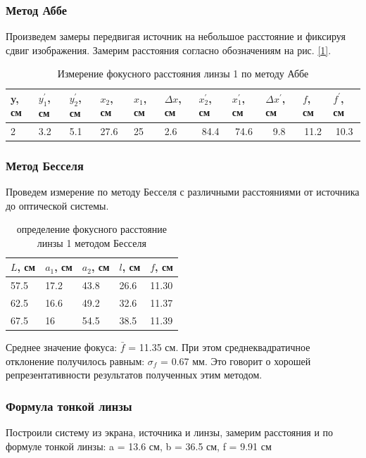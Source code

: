 \documentclass[a4paper, 12pt]{article}%
\newcommand{\picref}[1]{рис. \ref{#1}}
\begin{document}
	\subsubsection{Метод Аббе}
	Произведем замеры передвигая источник на небольшое расстояние и фиксируя сдвиг изображения. Замерим расстояния согласно обозначениям на \picref{1}.
	\begin{table}[H]
		\centering
		\begin{tabular}{|l|l|l|l|l|l|l|l|l|l|l|}
			\hline
			  y, см   &  $y_1^\prime$, см   &    $y_2^\prime$, см   &  $x_2$, см  &  $x_1$, см   &   $\Delta x$, см                        &     $x_2^\prime$, см                      &       $x_1^\prime$, см                   &    $\Delta x^\prime$, см                       &         $f$, см & $f^\prime$, см                  \\ \hline
			2 & 3.2 & 5.1 & 27.6 & 25 & 2.6 & \multicolumn{1}{c|}{84.4} & \multicolumn{1}{c|}{74.6} & \multicolumn{1}{c|}{9.8} & \multicolumn{1}{c|}{11.2} & \multicolumn{1}{c|}{10.3} \\ \hline
		\end{tabular}
		\caption{Измерение фокусного расстояния линзы 1 по методу Аббе}
	\end{table}
	\subsubsection{Метод Бесселя}
	Проведем измерение по методу Бесселя с различными расстояниями от источника до оптической системы.
	\begin{table}[H]
		\centering
		\begin{tabular}{|l|l|l|l|l|}
			\hline
		$L$, см	&    $a_1$, см  &   $a_2$, см   &  $l$, см    &  $f$, см     \\ \hline
			57.5 & 17.2 & 43.8 & 26.6 & 11.30 \\ \hline
			62.5 & 16.6 & 49.2 & 32.6 & 11.37 \\ \hline
			67.5 & 16   & 54.5 & 38.5 & 11.39 \\ \hline
		\end{tabular}
		\caption{определение фокусного расстояние линзы 1 методом Бесселя}
	\end{table}
	Среднее значение фокуса: $\bar{f}$ = 11.35 см. При этом среднеквадратичное отклонение получилось равным: $\sigma_f$ = 0.67 мм. Это говорит о хорошей репрезентативности результатов полученных этим методом.
	\subsubsection{Формула тонкой линзы}
	Построили систему из экрана, источника и линзы, замерим расстояния и по формуле тонкой линзы: a = 13.6 см, b = 36.5 см, f = 9.91 см
\end{document}
